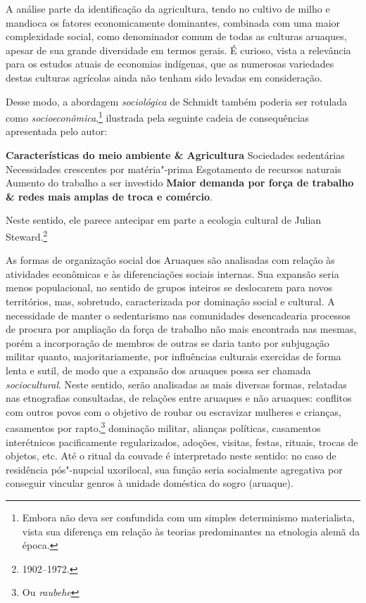 A análise parte da identificação da agricultura, tendo no cultivo de milho e mandioca os fatores economicamente dominantes, combinada com uma maior complexidade social, como denominador comum de todas as culturas aruaques, apesar de sua grande diversidade em termos gerais. É curioso, vista a relevância para os estudos atuais de economias indígenas, que as numerosas variedades destas culturas agrícolas ainda não tenham sido levadas em consideração.

Desse modo, a abordagem \textit{sociológica} de Schmidt também poderia ser
rotulada como \textit{socioeconômica},\footnote{Embora não deva ser confundida com um
simples determinismo materialista, vista sua diferença em relação às teorias
predominantes na etnologia alemã da época.} ilustrada pela seguinte cadeia de 
consequências apresentada pelo autor:
\medskip

\textbf{Características do meio ambiente \& Agricultura} \rightarrow{} Sociedades sedentárias \rightarrow{} Necessidades crescentes por matéria"-prima \rightarrow{} Esgotamento de recursos naturais \rightarrow{} Aumento do trabalho a ser investido \rightarrow{} \textbf{Maior demanda por força de trabalho \& redes mais amplas
de troca e comércio}.

\medskip
Neste sentido, ele parece antecipar em parte a
ecologia cultural de Julian Steward.\footnote{1902--1972.}

As formas de organização social dos Aruaques são analisadas com relação às atividades econômicas e às diferenciações sociais internas. Sua expansão seria menos populacional, no sentido de grupos inteiros se deslocarem para novos territórios, mas, sobretudo, caracterizada por dominação social e cultural. A necessidade de manter o sedentarismo nas comunidades desencadearia processos de procura por ampliação da força de trabalho não mais encontrada nas mesmas, porém a incorporação de membros de outras se daria tanto por subjugação militar quanto, majoritariamente, por influências culturais exercidas de forma lenta e sutil, de modo que a expansão dos aruaques possa ser chamada \textit{sociocultural}. Neste sentido, serão analisadas as mais diversas formas, relatadas nas etnografias consultadas, de relações entre aruaques e não aruaques: conflitos com outros povos com o objetivo de roubar ou escravizar mulheres e crianças, casamentos por rapto,\footnote{Ou \textit{raubehe}} dominação militar, alianças políticas, casamentos interétnicos pacificamente regularizados, adoções, visitas, festas, rituais, trocas de objetos, etc. Até o ritual da couvade é interpretado neste sentido: no caso de residência pós"-nupcial uxorilocal, %
sua função seria socialmente agregativa por conseguir vincular genros à unidade doméstica do sogro (aruaque).


